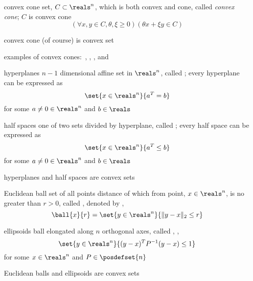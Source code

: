 \documentclass[17pt,landscape]{foils}
\begin{document}
{\begin{mydefinition}{convex cone}
	set, $C\subset \reals^n$,
	which is both convex and cone,
	called \emph{convex cone};
	$C$ is convex cone \iaoi\
	$$
		\left(
			\forall x, y\in C, \theta, \xi \geq0
		\right)
		\left(
			\theta x + \xi y \in C
		\right)
	$$
\end{mydefinition}

\bit
\item
	convex cone (of course) is convex set
\item
	examples of convex cones:\
	, , , and \
\eit



\begin{mydefinition}{hyperplanes}
	$n-1$ dimensional affine set in $\reals^n$,
	called ;
	every hyperplane
	can be expressed as
	$$
		\set{x\in\reals^n}{a^T = b}
	$$
	for some $a\neq0 \in \reals^n$ and $b\in \reals$
\end{mydefinition}

\begin{mydefinition}{half spaces}
	one of two sets divided by hyperplane,
	called ;
	every half space
	can be expressed as
	$$
		\set{x\in\reals^n}{a^T \leq b}
	$$
	for some $a\neq0 \in \reals^n$ and $b\in \reals$
\end{mydefinition}

\bit
\item
	hyperplanes and half spaces are convex sets
\eit



\begin{mydefinition}{Euclidean ball}
	set of all points distance of which from point, $x\in\reals^n$,
	is no greater than $r>0$,
	called ,
	denoted by \define{$\ball{x}{r}$},
	\ie\
	$$
		\ball{x}{r} = \set{y\in\reals^n}{\|y-x\|_2\leq r}
	$$
\end{mydefinition}

\begin{mydefinition}{ellipsoids}
	ball elongated along $n$ orthogonal axes,
	called \define{ellipsoid},
	\ie,
	$$
		\set{y\in\reals^n}{(y-x)^TP^{-1}(y-x)\leq 1}
	$$
	for some $x\in\reals^n$ and $P\in \posdefset{n}$
\end{mydefinition}

\bit
\item
	Euclidean balls and ellipsoids are convex sets
\eit


}
\end{document}

